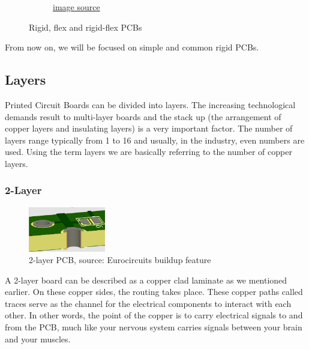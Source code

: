 \documentclass[final]{cubedoc}
\begin{document}
\begin{figure}[h!]
\begin{subfigure}{.3\textwidth}
			\caption{\href{https://web.archive.org/web/20200813145720/https://www.allaboutcircuits.com/technical-articles/pcbs-rigid-vs.-flexible-which-one-is-best-for-your-next-project/}{image source}}
			\label{fig:sub2}
		\end{subfigure}
		\caption{Rigid, flex and rigid-flex PCBs}
		\label{fig:test}
	\end{figure}
	
	From now on, we will be focused on simple and common rigid PCBs.
	
	\subsection{Layers}
	
	Printed Circuit Boards can be divided into layers. The increasing technological demands result to multi-layer boards and the stack up (the arrangement of copper layers and insulating layers)  is a very important factor. The number of layers range typically from 1 to 16 %
	and usually, in the industry, even numbers are used. Using the term layers we are basically referring to the number of copper layers.
	
	\subsubsection{2-Layer}
	
	\begin{figure}
		\centering
		\includegraphics[height=.1\textheight, width=0.3\textwidth]{assets/2_layer_euro_3D.png}
		\caption{2-layer PCB, \small{source: Eurocircuits buildup feature}}
	\end{figure}
	
	A 2-layer board can be described as a copper clad laminate as we mentioned earlier. On these copper sides, the routing takes place. These copper paths called traces serve as the channel for the electrical components to interact with each other. In other words, the point of the copper is to carry electrical signals to and from the PCB, much like your nervous system carries signals between your brain and your muscles. 
	
\end{document}
